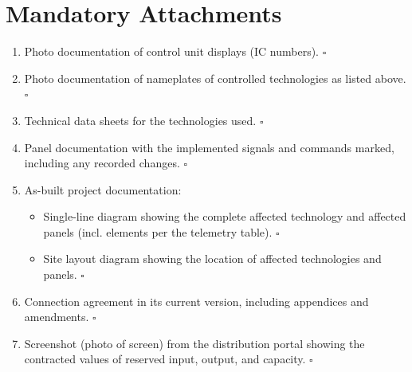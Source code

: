 \section{Mandatory Attachments}
    \begin{enumerate}[label=\alph*)]
        \item Photo documentation of control unit displays (IC numbers). \hfill $\square$
        \item Photo documentation of nameplates of controlled technologies as listed above. \hfill $\square$
        \item Technical data sheets for the technologies used. \hfill $\square$
        
        
        \item Panel documentation with the implemented signals and commands marked, \newline including any recorded changes. \hfill $\square$
        \item As-built project documentation:
        \begin{itemize}
            \item Single-line diagram showing the complete affected technology \newline and affected panels (incl. elements per the telemetry table). \hfill $\square$
            \item Site layout diagram showing the location of affected \newline technologies and panels. \hfill $\square$
        \end{itemize}
        \item Connection agreement in its current version, including appendices and amendments. \hfill $\square$
        \item Screenshot (photo of screen) from the distribution portal showing the contracted \newline values of reserved input, output, and capacity. \hfill $\square$
    \end{enumerate}
    \label{podkladyProChecklist}

